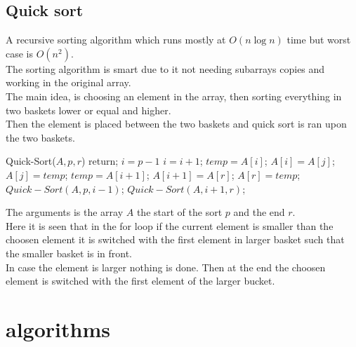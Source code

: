 \documentclass[12pt, a4paper]{article}
\begin{document}
			\subsection{Quick sort}
				A recursive sorting algorithm which runs mostly at $O(n\log n)$ time but worst case is $O(n^2)$.\\
				The sorting algorithm is smart due to it not needing subarrays copies and working in the original array.\\
				The main idea, is choosing an element in the array, then sorting everything in two baskets lower or equal and higher.\\
				Then the element is placed between the two baskets and quick sort is ran upon the two baskets.
				\begin{algorithmic}[1]
					\State Quick-Sort($A,p,r$)
					 \State return; \EndIf
					\State $i = p-1$
					\For {$j=p$ to $r-1$}
						\If {$A[j] \leq x$}
							\State $i=i+1$;
							\State $temp = A[i]$;
							\State $A[i] = A[j]$;
							\State $A[j] = temp$;
						\EndIf
					\EndFor
					\State $temp = A[i+1]$;
					\State $A[i+1] = A[r]$;
					\State $A[r] = temp$;
					\State $Quick-Sort(A,p,i-1)$;
					\State $Quick-Sort(A,i+1,r)$;
				\end{algorithmic}
				The arguments is the array $A$ the start of the sort $p$ and the end $r$.\\
				Here it is seen that in the for loop if the current element is smaller than the choosen element it is switched with the first element in larger basket such that the smaller basket is in front.\\
				In case the element is larger nothing is done. Then at the end the choosen element is switched with the first element of the larger bucket.
		\section{algorithms}
\end{document}
